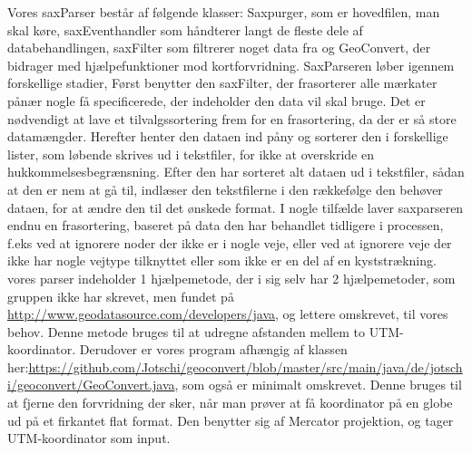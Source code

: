Vores saxParser  består af følgende klasser: Saxpurger, som er hovedfilen, man skal køre, saxEventhandler som håndterer langt de fleste dele af databehandlingen, saxFilter som filtrerer noget data fra og GeoConvert, der bidrager med hjælpefunktioner mod kortforvridning. SaxParseren løber igennem forskellige stadier, Først benytter den saxFilter, der frasorterer alle mærkater pånær nogle få specificerede, der indeholder den data vil skal bruge. Det er nødvendigt at lave et tilvalgssortering frem for en frasortering, da der er så store datamængder. Herefter henter den dataen ind påny og sorterer den i forskellige lister, som løbende skrives ud i tekstfiler, for ikke at overskride en hukkommelsesbegrænsning. Efter den har sorteret alt dataen ud i tekstfiler, sådan at den er nem at gå til, indlæser den tekstfilerne i den rækkefølge den behøver dataen, for at ændre den til det ønskede format. I nogle tilfælde laver saxparseren endnu en frasortering, baseret på data den har behandlet tidligere i processen, f.eks ved at ignorere noder der ikke er i nogle veje, eller ved at ignorere veje der ikke har nogle vejtype tilknyttet eller som ikke er en del af en kyststrækning. vores parser indeholder 1 hjælpemetode, der i sig selv har 2 hjælpemetoder, som gruppen ikke har skrevet, men fundet på \url{http://www.geodatasource.com/developers/java}, og lettere omskrevet, til vores behov. Denne metode bruges til at udregne afstanden mellem to UTM-koordinator. Derudover er vores program afhængig af klassen her:\url{https://github.com/Jotschi/geoconvert/blob/master/src/main/java/de/jotschi/geoconvert/GeoConvert.java}, som også er minimalt omskrevet. Denne bruges til at fjerne den forvridning der sker, når man prøver at få koordinator på en globe ud på et firkantet flat format. Den benytter sig af Mercator projektion, og tager UTM-koordinator som input.